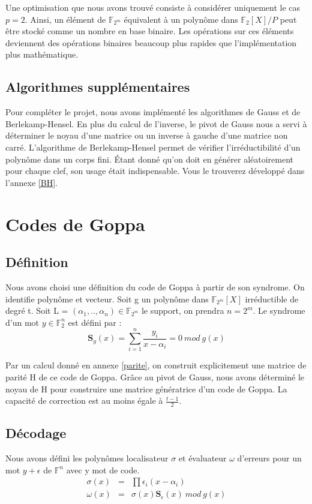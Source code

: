 \documentclass{article}
\begin{document}
			Une optimisation que nous avons trouvé consiste à considérer uniquement le cas $p = 2$.
			Ainsi, un élément de $\mathbb{F}_{2^{m}}$ équivalent à un polynôme dans $\mathbb{F}_{2}[X]/P$ peut être stocké comme un nombre en base binaire.
			Les opérations sur ces éléments deviennent des opérations binaires beaucoup plus rapides que l'implémentation plus mathématique.

		\subsection*{Algorithmes supplémentaires}
			Pour compléter le projet, nous avons implémenté les algorithmes de Gauss et de Berlekamp-Hensel.
			En plus du calcul de l'inverse, le pivot de Gauss nous a servi à déterminer le noyau d'une matrice ou un inverse à gauche d'une matrice non carré.
			L'algorithme de Berlekamp-Hensel \cite{berlekamp} permet de vérifier l'irréductibilité d'un polynôme dans un corps fini.
			Étant donné qu'on doit en générer aléatoirement pour chaque clef, son usage était indispensable.
			Vous le trouverez développé dans l'annexe \ref{BH}.

	\section{Codes de Goppa}

		\subsection*{Définition}
			Nous avons choisi une définition du code de Goppa à partir de son syndrome.
			On identifie polynôme et vecteur.
			Soit g un polynôme dans $\mathbb{F}_{2^{m}}[X]$ irréductible de degré t.
			Soit L = $ (\alpha_{1},..,\alpha_{n})  \in \mathbb{F}_{2^{m}}$ le support, on prendra $n = 2^{m}$.
			Le syndrome d'un mot $y \in \mathbb{F}_{2}^{n}$ est défini par :
			$$
				\mathbf{S}_{y}(x) = \sum_{i=1}^{n} \frac{y_{i}}{x-\alpha_{i}} = 0 \ mod \ g(x)
			$$

			Par un calcul donné en annexe \ref{parite}, on construit explicitement une matrice de parité H de ce code de Goppa.
			Grâce au pivot de Gauss, nous avons déterminé le noyau de H pour construire une matrice génératrice d'un code de Goppa.
			La capacité de correction est au moins égale à $\frac{t-1}{2}$.


		\subsection*{Décodage}
			Nous avons défini les polynômes localisateur $\sigma$ et évaluateur $\omega$ d'erreurs pour un mot $y + \epsilon$ de $\mathbb{F}^{n}$ avec y mot de code.
			\begin{eqnarray}
				\sigma(x) &=& \prod \epsilon_{i}(x - \alpha_{i}) \\
				\omega(x) &=& \sigma(x) \mathbf{S}_{\epsilon}(x) \ mod \ g(x)
			\end{eqnarray}
\end{document}
